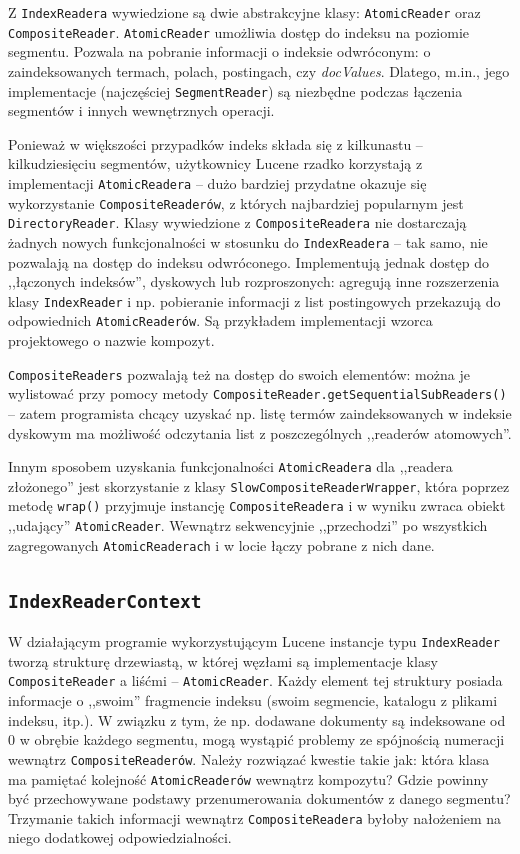 Z \texttt{IndexReadera} wywiedzione są dwie abstrakcyjne klasy: \texttt{AtomicReader} oraz \texttt{CompositeReader}. \texttt{AtomicReader} umożliwia dostęp do indeksu na poziomie segmentu. Pozwala na pobranie informacji o indeksie odwróconym: o zaindeksowanych termach, polach, postingach, czy \emph{docValues}. Dlatego, m.in., jego implementacje (najczęściej \texttt{SegmentReader}) są niezbędne podczas łączenia segmentów i innych wewnętrznych operacji.

Ponieważ w większości przypadków indeks składa się z kilkunastu -- kilkudziesięciu segmentów, użytkownicy Lucene rzadko korzystają z implementacji \texttt{AtomicReadera} -- dużo bardziej przydatne okazuje się wykorzystanie \texttt{CompositeReaderów}, z których najbardziej popularnym jest \texttt{DirectoryReader}. Klasy wywiedzione z \texttt{CompositeReadera} nie dostarczają żadnych nowych funkcjonalności w stosunku do \texttt{IndexReadera} -- tak samo, nie pozwalają na dostęp do indeksu odwróconego. Implementują jednak dostęp do ,,łączonych indeksów'', dyskowych lub rozproszonych: agregują inne rozszerzenia klasy \texttt{IndexReader} i np. pobieranie informacji z list postingowych przekazują do odpowiednich \texttt{AtomicReaderów}. Są przykładem implementacji wzorca projektowego o nazwie kompozyt.

\texttt{CompositeReaders} pozwalają też na dostęp do swoich elementów: można je wylistować przy pomocy metody \texttt{CompositeReader.getSequentialSubReaders()} -- zatem programista chcący uzyskać np. listę termów zaindeksowanych w indeksie dyskowym ma możliwość odczytania list z poszczególnych ,,readerów atomowych''.

Innym sposobem uzyskania funkcjonalności \texttt{AtomicReadera} dla ,,readera złożonego'' jest skorzystanie z klasy \texttt{SlowCompositeReaderWrapper}, która poprzez metodę \texttt{wrap()} przyjmuje instancję \texttt{CompositeReadera} i w wyniku zwraca obiekt ,,udający'' \texttt{AtomicReader}. Wewnątrz sekwencyjnie ,,przechodzi'' po wszystkich zagregowanych \texttt{AtomicReaderach} i w locie łączy pobrane z nich dane.

\subsection{\texttt{IndexReaderContext}}

W działającym programie wykorzystującym Lucene instancje typu \texttt{IndexReader} tworzą strukturę drzewiastą, w której węzłami są implementacje klasy \texttt{CompositeReader} a liśćmi -- \texttt {AtomicReader}. Każdy element tej struktury posiada informacje o ,,swoim'' fragmencie indeksu (swoim segmencie, katalogu z plikami indeksu, itp.). W związku z tym, że np. dodawane dokumenty są indeksowane od 0 w obrębie każdego segmentu, mogą wystąpić problemy ze spójnością numeracji wewnątrz \texttt{CompositeReaderów}. Należy rozwiązać kwestie takie jak: która klasa ma pamiętać kolejność \texttt{AtomicReaderów} wewnątrz kompozytu? Gdzie powinny być przechowywane podstawy przenumerowania dokumentów z danego segmentu? Trzymanie takich informacji wewnątrz \texttt{CompositeReadera} byłoby nałożeniem na niego dodatkowej odpowiedzialności.

